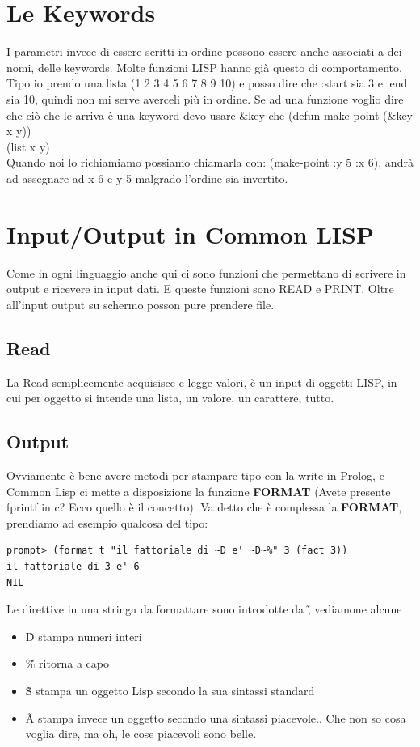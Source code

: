 \documentclass[12pt, a4paper, openany, oneside]{book}
\begin{document}
\chapter{Le Keywords}
I parametri invece di essere scritti in ordine possono essere anche associati
a dei nomi, delle keywords. Molte funzioni LISP hanno già questo di comportamento.
Tipo io prendo una lista (1 2 3 4 5 6 7 8 9 10) e posso dire che :start sia 3
e :end sia 10, quindi non mi serve averceli più in ordine. Se ad una 
funzione voglio dire che ciò che le arriva è una keyword devo usare \&key che
(defun make-point (\&key x y))\\
(list x y)\\
Quando noi lo richiamiamo possiamo chiamarla con: (make-point :y 5 :x 6), 
andrà ad assegnare ad x 6 e y 5 malgrado l'ordine sia invertito.

\chapter{Input/Output in Common LISP}
Come in ogni linguaggio anche qui ci sono funzioni che permettano di scrivere
in output e ricevere in input dati. E queste funzioni sono READ e PRINT.
Oltre all'input output su schermo posson pure prendere file.
\section{Read}
La Read semplicemente acquisisce e legge valori, è un input di oggetti LISP, 
in cui per oggetto si intende una lista, un valore, un carattere, tutto. 
\section{Output}
Ovviamente è bene avere metodi per stampare tipo con la write in Prolog, e 
Common Lisp ci mette a disposizione la funzione \textbf{FORMAT} (Avete 
presente fprintf in c? Ecco quello è il concetto). Va detto che è complessa
la \textbf{FORMAT}, prendiamo ad esempio qualcosa del tipo: 
\begin{lstlisting}[language=LISP]
prompt> (format t "il fattoriale di ~D e' ~D~%" 3 (fact 3))
il fattoriale di 3 e' 6
NIL
\end{lstlisting}
Le direttive in una stringa da formattare sono introdotte da \~, vediamone alcune
\begin{itemize}
	\item \~D stampa numeri interi
	\item \~\% ritorna a capo
	\item \~S stampa un oggetto Lisp secondo la sua sintassi standard
	\item \~A stampa invece un oggetto secondo una sintassi piacevole.. Che non
	so cosa voglia dire, ma oh, le cose piacevoli sono belle.
\end{itemize}
\end{document}

